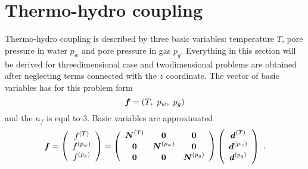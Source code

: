 \documentclass[12pt]{book}
\newcommand{\mbf}[1]{\mbox{\boldmath$#1$}}
\begin{document}
\section{Thermo-hydro coupling}
Thermo-hydro coupling is described by three basic variables: temperature $T$, pore pressure in water $p_w$
and pore pressure in gas $p_g$. Everything in this section will be derived for threedimensional case and
twodimensional problems are obtained after neglecting terms connected with the $z$ coordinate. The vector
of basic variables has for this problem form
\begin{equation}
\mbf{f} = \left(T,\ p_w,\ p_g\right)
\end{equation}
and the $n_f$ is equl to 3. Basic variables are approximated
\begin{equation}
\mbf{f} =
\left(\begin{array}{c}
f^{(T)}
\\
f^{(p_w)}
\\
f^{(p_g)}
\end{array}\right)
=
\left(\begin{array}{ccc}
\mbf{N}^{(T)} & \mbf{0}         & \mbf{0}
\\
\mbf{0}       & \mbf{N}^{(p_w)} & \mbf{0}
\\
\mbf{0}       & \mbf{0}         & \mbf{N}^{(p_g)}
\\
\end{array}\right)
\left(\begin{array}{c}
\mbf{d}^{(T)}
\\
\mbf{d}^{(p_w)}
\\
\mbf{d}^{(p_g)}
\end{array}\right)\ .
\end{equation}
\end{document}
